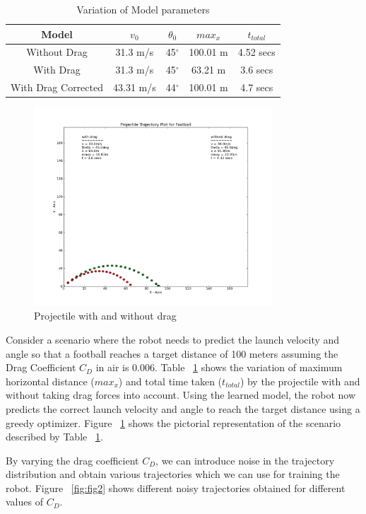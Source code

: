 \documentclass[conference]{IEEEtran}
\begin{document}
\begin{table}[t]\renewcommand{\arraystretch}{1.5}\addtolength{\tabcolsep}{-1pt}
\centering
\caption{Variation of Model parameters}
\begin{tabular}{  | c | c | c | c | c |}
  \hline
  Model & $v_{0}$ & $\theta_{0}$ & $max_{x}$ & $t_{total}$\\
  \hline 
  Without Drag  & 31.3 m/s  & 45$^{\circ}$ & 100.01 m & 4.52 secs  \\ 
  \hline
  With Drag  & 31.3 m/s  & 45$^{\circ}$ & 63.21 m & 3.6 secs  \\
  \hline
  With Drag Corrected  & 43.31 m/s  & 44$^{\circ}$ & 100.01 m & 4.7 secs  \\
  \hline
\end{tabular}
\label{tab:tab1}
\end{table}

\begin{figure}[!t]
\centering
\includegraphics[width=3.5in]{fig1}
\caption{Projectile with and without drag}
\label{fig:fig1}
\end{figure}

Consider a scenario where the robot needs to predict the launch velocity and angle so that a football reaches a target distance of 100 meters assuming the Drag Coefficient $C_{D}$ in air is 0.006.  Table ~\ref{tab:tab1} shows the variation of maximum horizontal distance ($max_{x}$) and total time taken ($t_{total}$) by the projectile with and without taking drag forces into account. Using the learned model, the robot now predicts the correct launch velocity and angle to reach the target distance using a greedy optimizer. Figure ~\ref{fig:fig1} shows the pictorial representation of the scenario described by Table ~\ref{tab:tab1}.  

By varying the drag coefficient $C_{D}$, we can introduce noise in the trajectory distribution and obtain various trajectories which we can use for training the robot. Figure ~\ref{fig:fig2} shows different noisy trajectories obtained for different values of $C_{D}$.
\end{document}
